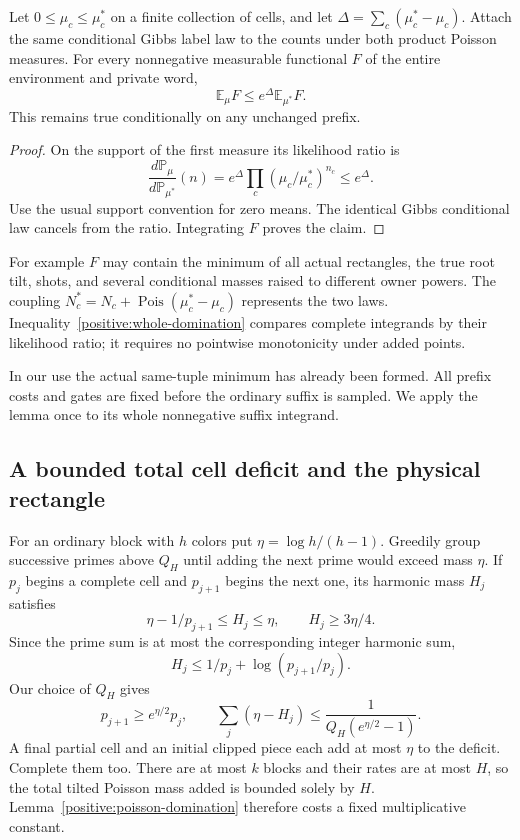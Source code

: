 \begin{lemma}
\label{positive:poisson-domination}
Let $0\leq\mu_c\leq\mu_c^*$ on a finite collection of cells, and let
$\Delta=\sum_c(\mu_c^*-\mu_c)$. Attach the same conditional Gibbs label
law to the counts under both product Poisson measures. For every
nonnegative measurable functional $F$ of the entire environment and
private word,
\begin{equation}
 \mathbb E_{\mu}F\leq e^\Delta\mathbb E_{\mu^*}F.
 \label{positive:whole-domination}
\end{equation}
This remains true conditionally on any unchanged prefix.
\end{lemma}
\begin{proof}
On the support of the first measure its likelihood ratio is
\[
 \frac{d\mathbb P_\mu}{d\mathbb P_{\mu^*}}(n)
   =e^\Delta\prod_c(\mu_c/\mu_c^*)^{n_c}\leq e^\Delta.
\]
Use the usual support convention for zero means. The identical Gibbs
conditional law cancels from the ratio. Integrating $F$ proves the claim.
\end{proof}

For example $F$ may contain the minimum of all actual rectangles, the
true root tilt, shots, and several conditional masses raised to different
owner powers. The coupling
$N_c^*=N_c+\operatorname{Pois}(\mu_c^*-\mu_c)$ represents the two
laws. Inequality~\eqref{positive:whole-domination} compares complete
integrands by their likelihood ratio; it requires no pointwise
monotonicity under added points.

In our use the actual same-tuple minimum has already been formed. All
prefix costs and gates are fixed before the ordinary suffix is sampled.
We apply the lemma once to its whole nonnegative suffix integrand.

\subsection{A bounded total cell deficit and the physical rectangle}
For an ordinary block with $h$ colors put $\eta=\log h/(h-1)$.
Greedily group successive primes above $Q_H$ until adding the next prime
would exceed mass $\eta$. If $p_j$ begins a complete cell and $p_{j+1}$
begins the next one, its harmonic mass $H_j$ satisfies
\begin{equation}
 \eta-1/p_{j+1}\leq H_j\leq\eta,
 \qquad H_j\geq3\eta/4.
 \label{positive:cell-deficit}
\end{equation}
Since the prime sum is at most the corresponding integer harmonic sum,
\[
 H_j\leq 1/p_j+\log(p_{j+1}/p_j).
\]
Our choice of $Q_H$ gives
\begin{equation}
 p_{j+1}\geq e^{\eta/2}p_j,\qquad
 \sum_j(\eta-H_j)
   \leq\frac1{Q_H(e^{\eta/2}-1)}.
 \label{positive:total-deficit}
\end{equation}
A final partial cell and an initial clipped piece each add at most
$\eta$ to the deficit. Complete them too. There are at most $k$ blocks
and their rates are at most $H$, so the total tilted Poisson mass added
is bounded solely by $H$. Lemma~\ref{positive:poisson-domination}
therefore costs a fixed multiplicative constant.

